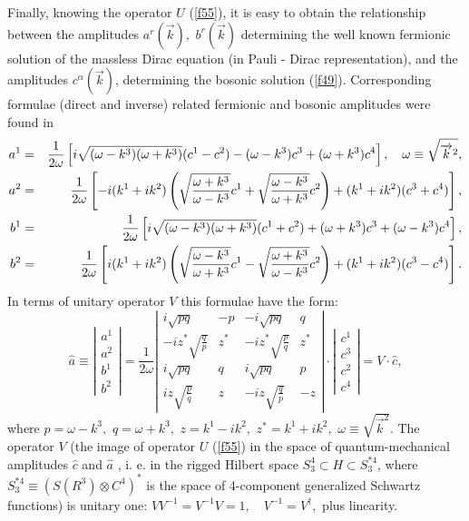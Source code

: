 \documentclass[a4paper,12pt]{article}
\begin{document}
Finally, knowing the operator $U$ (\ref{f55}), it is easy to obtain the
relationship between the amplitudes $a^r(\overrightarrow{k}),$ $b^r(%
\overrightarrow{k})$ determining the well known fermionic solution of the
massless Dirac equation (in Pauli - Dirac representation), and the
amplitudes $c^\alpha (\overrightarrow{k})$, determining the bosonic solution
(\ref{f49}). Corresponding formulae (direct and inverse) related fermionic
and bosonic amplitudes were found in \cite{S2}
\begin{eqnarray}
a^1 &=&\frac 1{2\omega }\left[ i\sqrt{(\omega -k^3)(\omega +k^3)}%
(c^1-c^2)-(\omega -k^3)c^3+(\omega +k^3)c^4\right] ,\quad \omega \equiv
\sqrt{\overrightarrow{k}^2},  \label{f63} \\
a^2 &=&\frac 1{2\omega }\left[ -i(k^1+ik^2)\left( \sqrt{\frac{\omega +k^3}{%
\omega -k^3}}c^1+\sqrt{\frac{\omega -k^3}{\omega +k^3}}c^2\right)
+(k^1+ik^2)(c^3+c^4)\right] ,  \nonumber \\
b^1 &=&\frac 1{2\omega }\left[ i\sqrt{(\omega -k^3)(\omega +k^3)}%
(c^1+c^2)+(\omega +k^3)c^3+(\omega -k^3)c^4\right] ,  \nonumber \\
b^2 &=&\frac 1{2\omega }\left[ i(k^1+ik^2)\left( \sqrt{\frac{\omega -k^3}{%
\omega +k^3}}c^1-\sqrt{\frac{\omega +k^3}{\omega -k^3}}c^2\right)
+(k^1+ik^2)(c^3-c^4)\right] .  \nonumber
\end{eqnarray}
In terms of unitary operator $V$ this formulae have the form:
\begin{equation}
\widehat{a}\equiv \left|
\begin{array}{c}
a^1 \\
a^2 \\
b^1 \\
b^2
\end{array}
\right| =\frac 1{2\omega }\left|
\begin{array}{cccc}
i\sqrt{pq} & -p & -i\sqrt{pq} & q \\
-iz^{*}\sqrt{\frac qp} & z^{*} & -iz^{*}\sqrt{\frac pq} & z^{*} \\
i\sqrt{pq} & q & i\sqrt{pq} & p \\
iz\sqrt{\frac pq} & z & -iz\sqrt{\frac qp} & -z
\end{array}
\right| \cdot \left|
\begin{array}{c}
c^1 \\
c^3 \\
c^2 \\
c^4
\end{array}
\right| =V\cdot \widehat{c},  \label{f64}
\end{equation}
where $p=\omega -k^3,$ $q=\omega +k^3,$ $z=k^1-ik^2,$ $z^{*}=k^1+ik^2,$ $%
\omega \equiv \sqrt{\overrightarrow{k}^2}$. The operator $V$ (the image of
operator $U$ (\ref{f55}) in the space of quantum-mechanical amplitudes $%
\widehat{c}$ and $\widehat{a}$ , i. e. in the rigged Hilbert space $%
S_3^4\subset H\subset S_3^{*4}$, where $S_3^{*4}\equiv (S(R^3)\otimes
C^4)^{*}$ is the space of 4-component generalized Schwartz functions) is
unitary one: $VV^{-1}=V^{-1}V=1,\quad V^{-1}=V^{\dagger },$ plus linearity.
\end{document}
